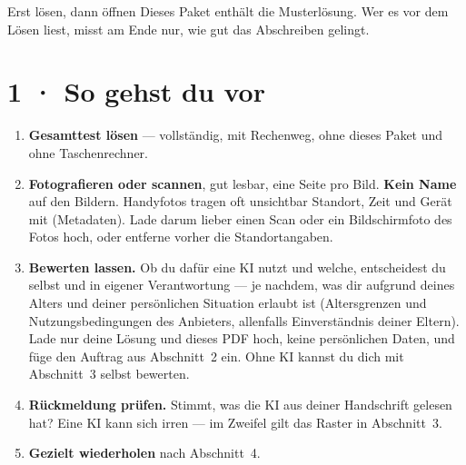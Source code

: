\documentclass[11pt]{article}
\begin{document}

\begin{lpachtung}{Erst lösen, dann öffnen}
Dieses Paket enthält die Musterlösung. Wer es vor dem Lösen liest, misst am Ende nur, wie gut das Abschreiben gelingt.
\end{lpachtung}

\section*{1 · So gehst du vor}
\begin{enumerate}[leftmargin=*,itemsep=2pt]
\item \textbf{Gesamttest lösen} — vollständig, mit Rechenweg, ohne dieses Paket und ohne Taschenrechner.
\item \textbf{Fotografieren oder scannen}, gut lesbar, eine Seite pro Bild. \textbf{Kein Name} auf den Bildern.
  Handyfotos tragen oft unsichtbar Standort, Zeit und Gerät mit (Metadaten). Lade darum lieber einen Scan oder ein
  Bildschirmfoto des Fotos hoch, oder entferne vorher die Standortangaben.
\item \textbf{Bewerten lassen.} Ob du dafür eine KI nutzt und welche, entscheidest du selbst und in eigener Verantwortung —
  je nachdem, was dir aufgrund deines Alters und deiner persönlichen Situation erlaubt ist (Altersgrenzen und
  Nutzungsbedingungen des Anbieters, allenfalls Einverständnis deiner Eltern). Lade nur deine Lösung und dieses PDF hoch,
  keine persönlichen Daten, und füge den Auftrag aus Abschnitt~2 ein. Ohne KI kannst du dich mit Abschnitt~3 selbst bewerten.
\item \textbf{Rückmeldung prüfen.} Stimmt, was die KI aus deiner Handschrift gelesen hat? Eine KI kann sich irren —
  im Zweifel gilt das Raster in Abschnitt~3.
\item \textbf{Gezielt wiederholen} nach Abschnitt~4.
\end{enumerate}

\end{document}
